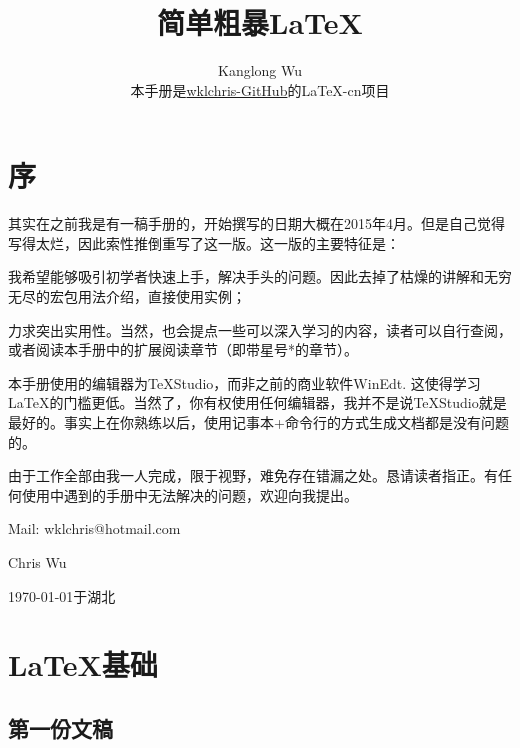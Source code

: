 

\title{简单粗暴\LaTeX }
\author{Kanglong Wu\\
  { 本手册是\href{https://github.com/wklchris/Note-by-LaTeX}{wklchris-GitHub}的\LaTeX{}-cn项目}
}


	
\maketitle

\tableofcontents

\chapter{序}

\dpar\dpar

其实在之前我是有一稿手册的，开始撰写的日期大概在2015年4月。但是自己觉得写得太烂，因此索性推倒重写了这一版。这一版的主要特征是：
\begin{feae}
	\item 我希望能够吸引初学者快速上手，解决手头的问题。因此去掉了枯燥的讲解和无穷无尽的宏包用法介绍，直接使用实例；
	\item 力求突出实用性。当然，也会提点一些可以深入学习的内容，读者可以自行查阅，或者阅读本手册中的扩展阅读章节（即带星号*的章节）。
	\item 本手册使用的编辑器为\TeX Studio，而非之前的商业软件WinEdt. 这使得学习\LaTeX 的门槛更低。当然了，你有权使用任何编辑器，我并不是说\TeX Studio就是最好的。事实上在你熟练以后，使用记事本+命令行的方式生成文档都是没有问题的。
\end{feae}

由于工作全部由我一人完成，限于视野，难免存在错漏之处。恳请读者指正。有任何使用中遇到的手册中无法解决的问题，欢迎向我提出。

\vfill

\begin{flushright}
Mail: wklchris@hotmail.com\dpar

Chris Wu

\today 于湖北
\end{flushright}



\chapter{\LaTeX{}基础}
\section{第一份文稿}

